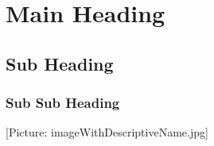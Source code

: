﻿\section{Main Heading}


\subsection{Sub Heading}


\subsubsection{Sub Sub Heading}


[Picture: imageWithDescriptiveName.jpg]